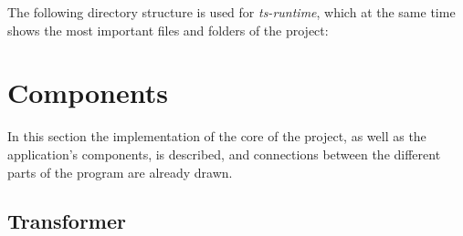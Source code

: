 The following directory structure is used for \emph{ts-runtime}, which at the same time shows the most important files and folders of the project:
\begin{center}
\begin{varwidth}{\textwidth}
\hspace*{-1.2em}\begin{minipage}[t]{1.0\textwidth}
%
\end{minipage}
\end{varwidth}
\end{center}

\section{Components}
\label{sec:components}


In this section the implementation of the core of the project, as well as the application's components, is described, and connections between the different parts of the program are already drawn.

\subsection{Transformer}

